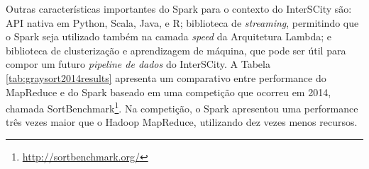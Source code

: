 Outras características importantes do Spark para o contexto do
InterSCity são: API nativa em Python, Scala, Java, e R; biblioteca de
\textit{streaming}, permitindo que o Spark seja utilizado também na camada
\textit{speed} da Arquitetura Lambda; e biblioteca de clusterização e
aprendizagem de máquina, que pode ser útil para compor um futuro \textit{pipeline
de dados} do InterSCity. A Tabela \ref{tab:graysort2014results} apresenta
um comparativo entre performance do MapReduce e do Spark baseado em uma
competição que ocorreu em 2014, chamada
SortBenchmark\footnote{\url{http://sortbenchmark.org/}}. Na competição, o Spark
apresentou uma performance três vezes maior que o Hadoop MapReduce, utilizando
dez vezes menos recursos.


\begin{table}[!htbp]
    \centering
    \caption[Resultados da Sort Benchmark 2014, categoria GraySort]{Resultados da Sort Benchmark 2014, categoria GraySort. Fonte: Databricks, 2014\footnotemark.}
    \label{tab:graysort2014results}
\end{table}

